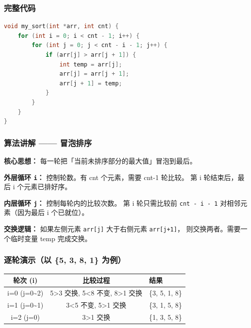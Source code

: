 \subsubsection{完整代码}

\begin{lstlisting}[language=C]
void my_sort(int *arr, int cnt) {
    for (int i = 0; i < cnt - 1; i++) {
        for (int j = 0; j < cnt - i - 1; j++) {
            if (arr[j] > arr[j + 1]) {
                int temp = arr[j];
                arr[j] = arr[j + 1];
                arr[j + 1] = temp;
            }
        }
    }
}
\end{lstlisting}

\subsubsection{算法讲解 —— 冒泡排序}

\textbf{核心思想：} 每一轮把「当前未排序部分的最大值」冒泡到最后。

\vspace{0.3em}
\textbf{外层循环 \texttt{i}：} 控制轮数。有 cnt 个元素，需要 cnt-1 轮比较。
第 i 轮结束后，最后 i 个元素已排好序。

\textbf{内层循环 \texttt{j}：} 控制每轮内的比较次数。
第 i 轮只需比较前 \texttt{cnt - i - 1} 对相邻元素（因为最后 i 个已就位）。

\textbf{交换逻辑：} 如果左侧元素 \texttt{arr[j]} 大于右侧元素 \texttt{arr[j+1]}，
则交换两者。需要一个临时变量 temp 完成交换。

\subsubsection{逐轮演示（以 \{5, 3, 8, 1\} 为例）}

\begin{table}[h]
    \centering
    \begin{tabular}{@{}ccl@{}}
        \toprule
        \textbf{轮次 (i)} & \textbf{比较过程} & \textbf{结果} \\
        \midrule
        i=0 (j=0\~{}2) & 5>3 交换, 5<8 不变, 8>1 交换 & \{3, 5, 1, {\color{highlight}8}\} \\
        i=1 (j=0\~{}1) & 3<5 不变, 5>1 交换           & \{3, 1, {\color{highlight}5}, 8\} \\
        i=2 (j=0)  & 3>1 交换                         & \{1, {\color{highlight}3}, 5, 8\} \\
        \bottomrule
    \end{tabular}
\end{table}

